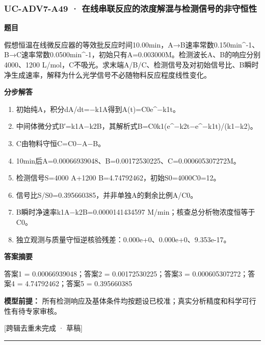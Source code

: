 \documentclass[UTF8,11pt,a4paper]{ctexart}
\begin{document}
\subsubsection*{UC-ADV7-A49 · 在线串联反应的浓度解混与检测信号的非守恒性}
\noindent\textbf{题目}\par
假想恒温在线微反应器的等效批反应时间10.00min，A→B速率常数0.150min\textasciicircum{}-1、B→C速率常数0.0500min\textasciicircum{}-1，初始只有A=0.003000M。检测波长A、B的响应分别4000、1200 L/mol，C不吸光。求末端A/B/C、检测信号及对初始信号比、B瞬时净生成速率，解释为什么光学信号不必随物料反应程度线性变化。\par
\medskip\noindent\textbf{分步解答}
\begin{enumerate}
\item 初始纯A，积分dA/dt=−k1A得到A(t)=C0e\textasciicircum{}−k1t。
\item 中间体微分式B′=k1A−k2B，其解析式B=C0k1(e\textasciicircum{}−k2t−e\textasciicircum{}−k1t)/(k1−k2)。
\item C由物料守恒C=C0−A−B。
\item 10min后A=0.00066939048、B=0.00172530225、C=0.000605307272M。
\item 检测信号S=4000 A+1200 B=4.74792462，初始S0=4000C0=12。
\item 信号比S/S0=0.395660385，并非单独A的剩余比例A/C0。
\item B瞬时净速率k1A−k2B=0.0000141434597 M/min；核查总分析物浓度恒等于C0。
\item 独立观测与质量守恒逆核验残差：0.000e+0、0.000e+0、9.353e-17。
\end{enumerate}
\noindent\textbf{答案摘要}\par
答案1 = 0.00066939048；答案2 = 0.00172530225；答案3 = 0.000605307272；答案4 = 4.74792462；答案5 = 0.395660385\par
\noindent\textbf{模型前提：}
所有检测响应及基体条件均按题设已校准；真实分析精度和科学可行性有待专家审核。\par
\noindent\textcolor{red!65!black}{[跨辑去重未完成 · 草稿]} \par
\medskip\hrule\medskip
{}
\end{document}
